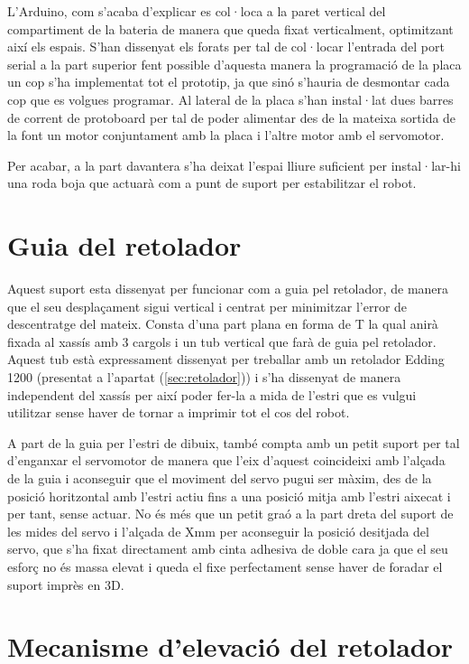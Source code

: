 L’Arduino, com s’acaba d’explicar es col·loca a la paret vertical del compartiment de la bateria de manera que queda fixat verticalment, optimitzant així els espais. S’han dissenyat els forats per tal de col·locar l’entrada del port serial a la part superior fent possible d’aquesta manera la programació de la placa un cop s’ha implementat tot el prototip, ja que sinó s'hauria de desmontar cada cop que es volgues programar. Al lateral de la placa s’han instal·lat dues barres de corrent de protoboard per tal de poder alimentar des de la mateixa sortida de la font un motor conjuntament amb la placa i l’altre motor amb el servomotor. 

Per acabar, a la part davantera s’ha deixat l’espai lliure suficient per instal·lar-hi una roda boja que actuarà com a punt de suport per estabilitzar el robot. 

\section{Guia del retolador}

Aquest suport esta dissenyat per funcionar com a guia pel retolador, de manera que el seu desplaçament sigui vertical i centrat per minimitzar l’error de descentratge del mateix. Consta d’una part plana en forma de T la qual anirà fixada al xassís amb 3 cargols i un tub vertical que farà de guia pel retolador. Aquest tub està expressament dissenyat per treballar amb un retolador Edding 1200 (presentat a l’apartat (\ref{sec:retolador})) i s’ha dissenyat de manera independent del xassís per així poder fer-la a mida de l’estri que es vulgui utilitzar sense haver de tornar a imprimir tot el cos del robot. 

A part de la guia per l’estri de dibuix, també compta amb un petit suport per tal d’enganxar el servomotor de manera que l’eix d’aquest coincideixi amb l’alçada de la guia i aconseguir que el moviment del servo pugui ser màxim, des de la posició horitzontal amb l’estri actiu fins a una posició mitja amb l’estri aixecat i per tant, sense actuar. No és més que un petit graó a la part dreta del suport de les mides del servo i l’alçada de Xmm per aconseguir la posició desitjada del servo, que s’ha fixat directament amb cinta adhesiva de doble cara ja que el seu esforç no és massa elevat i queda el fixe perfectament sense haver de foradar el suport imprès en 3D. 

\section{Mecanisme d'elevació del retolador} \label{sec:suportmobil}

